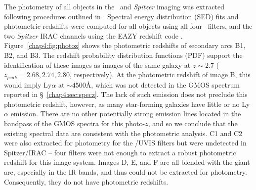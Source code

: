 The photometry of all objects in the \hst\ and {\it Spitzer} imaging was extracted following procedures outlined in \citet{Skelton:2014lr}. Spectral energy distribution (SED) fits and photometric redshifts were computed for all objects using all four \hst\ filters, and the two \textit{Spitzer} IRAC channels using the EAZY redshift code \citep{Brammer:2008uq}. Figure~\ref{chap4:fig:photoz} shows the photometric redshifts of secondary arcs B1, B2, and B3. The redshift probability distribution functions (PDF) support the identification of these images as images of the same galaxy at $z\sim2.7$ ($z_{peak} = 2.68, 2.74, 2.80$, respectively).  At the photometric redshift of image B, this would imply Ly$\alpha$ at $\sim$4500\AA, which was not detected in the GMOS spectrum reported in \S~\ref{chap4:sec:specz}. The lack of such emission does not preclude this photometric redshift, however, as many star-forming galaxies have little or no Ly$\alpha$ emission. There are no other potentially strong emission lines located in the bandpass of the GMOS spectra for this photo-$z$, and so we conclude that the existing spectral data are consistent with the photometric analysis. C1 and C2 were also extracted for photometry for the \hst/UVIS filters but were undetected in Spitzer/IRAC -- four filters were not enough to extract a robust photometric redshift for this image system. Images D, E, and F are all blended with the giant arc, especially in the IR bands, and thus could not be extracted for photometry. Consequently, they do not have photometric redshifts.

